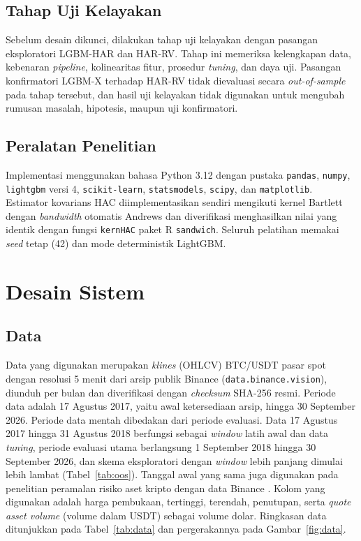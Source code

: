 \subsection{Tahap Uji Kelayakan}
Sebelum desain dikunci, dilakukan tahap uji kelayakan dengan pasangan
eksploratori LGBM-HAR dan HAR-RV. Tahap ini memeriksa kelengkapan data,
kebenaran \textit{pipeline}, kolinearitas fitur, prosedur \textit{tuning}, dan
daya uji. Pasangan konfirmatori LGBM-X terhadap HAR-RV tidak dievaluasi secara
\textit{out-of-sample} pada tahap tersebut, dan hasil uji kelayakan tidak
digunakan untuk mengubah rumusan masalah, hipotesis, maupun uji konfirmatori.


\subsection{Peralatan Penelitian}
\label{subsec:peralatan}
Implementasi menggunakan bahasa Python 3.12 dengan pustaka \texttt{pandas},
\texttt{numpy}, \texttt{lightgbm} versi 4, \texttt{scikit-learn},
\texttt{statsmodels}, \texttt{scipy}, dan \texttt{matplotlib}. Estimator
kovarians HAC diimplementasikan sendiri mengikuti kernel Bartlett dengan
\textit{bandwidth} otomatis Andrews \cite{andrews1991} dan diverifikasi
menghasilkan nilai yang identik dengan fungsi \texttt{kernHAC} paket R
\texttt{sandwich}. Seluruh pelatihan memakai \textit{seed} tetap (42) dan mode
deterministik LightGBM.


\section{Desain Sistem}

\subsection{Data}
\label{subsec:data}
Data yang digunakan merupakan \textit{klines} (OHLCV) BTC/USDT pasar spot dengan
resolusi 5 menit dari arsip publik Binance (\texttt{data.binance.vision}),
diunduh per bulan dan diverifikasi dengan \textit{checksum} SHA-256 resmi.
Periode data adalah 17 Agustus 2017, yaitu awal ketersediaan arsip, hingga
30 September 2026. Periode data mentah dibedakan dari periode evaluasi. Data
17 Agustus 2017 hingga 31 Agustus 2018 berfungsi sebagai \textit{window} latih
awal dan data \textit{tuning}, periode evaluasi utama berlangsung 1 September
2018 hingga 30 September 2026, dan skema eksploratori dengan \textit{window}
lebih panjang dimulai lebih lambat (Tabel~\ref{tab:oos}). Tanggal awal yang
sama juga digunakan pada penelitian
peramalan risiko aset kripto dengan data Binance \cite{trucios2023}. Kolom
yang digunakan adalah harga pembukaan, tertinggi,
terendah, penutupan, serta \textit{quote asset volume} (volume dalam USDT)
sebagai volume dolar. Ringkasan data ditunjukkan pada Tabel~\ref{tab:data} dan
pergerakannya pada Gambar~\ref{fig:data}.

